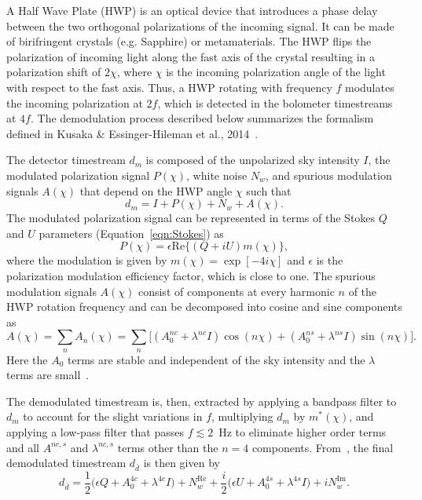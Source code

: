 A Half Wave Plate (HWP) is an optical device that introduces a phase delay between the two orthogonal polarizations of the incoming signal. It can be made of birifringent crystals (e.g. Sapphire) or metamaterials. The HWP flips the polarization of incoming light along the fast axis of the crystal resulting in a polarization shift of $2\chi$, where $\chi$ is the incoming polarization angle of the light with respect to the fast axis. Thus, a HWP rotating with frequency $f$ modulates the incoming polarization at $2f$, which is detected in the bolometer timestreams at $4f$. The demodulation process described below summarizes the formalism defined in Kusaka \& Essinger-Hileman et al., 2014~\cite{ABS_HWP}.

The detector timestream $d_{m}$ is composed of the unpolarized sky intensity $I$, the modulated polarization signal $P(\chi)$, white noise $N_{w}$, and spurious modulation signals $A(\chi)$ that depend on the HWP angle $\chi$ such that
\begin{equation}
d_{m}= I + P(\chi)+ N_{w} + A(\chi).
\end{equation}
The modulated polarization signal can be represented in terms of the Stokes $Q$ and $U$ parameters (Equation~\ref{eqn:Stokes}) as
\begin{equation}
P(\chi)=\epsilon \mathrm{Re}\{(Q+iU) m(\chi)\},
\end{equation}
where the modulation is given by $m(\chi)=\exp[-4 i \chi]$ and $\epsilon$ is the polarization modulation efficiency factor, which is close to one. The spurious modulation signals $A(\chi)$ consist of components at every harmonic $n$ of the HWP rotation frequency and can be decomposed into cosine and sine components as
\begin{equation}\label{eqn:achi}
A(\chi)= \sum_{n} A_n(\chi)=\sum_{n}\Big[ (A^{nc}_{0} + \lambda^{nc} I) \cos(n\chi) + (A^{ns}_{0} + \lambda^{ns} I) \sin(n\chi)    \Big].
\end{equation}
Here the $A_{0}$ terms are stable and independent of the sky intensity and the $\lambda$ terms are small~\cite{ABS_HWP}.

The demodulated timestream is, then, extracted by applying a bandpass filter to $d_{m}$ to account for the slight variations in $f$, multiplying $d_{m}$ by $m^*(\chi)$, and applying a low-pass filter that passes $f\lesssim2$~Hz to eliminate higher order terms and all $A^{nc,s}$ and $\lambda^{nc,s}$ terms other than the $n=4$ components. From~\cite{ABS_HWP}, the final demodulated timestream $d_{\bar{d}}$ is then given by
\begin{equation}
d_{\bar{d}}=\frac{1}{2}\Big(\epsilon Q + A^{4c}_{0} + \lambda^{4c} I \Big) + N^{\mathrm{Re}}_{w} + \frac{i}{2}\Big(\epsilon U + A^{4s}_{0} + \lambda^{4s} I \Big) + iN^{\mathrm{Im}}_{w}.
\end{equation}
